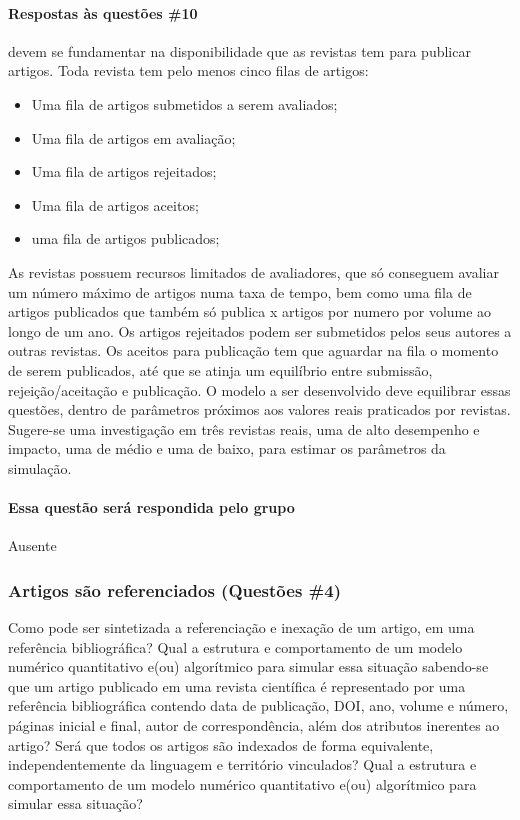 \paragraph{Respostas às questões \#10} devem se fundamentar na disponibilidade que as revistas tem para publicar artigos. Toda revista tem pelo menos cinco filas de artigos:
\begin{itemize}
    \item Uma fila de artigos submetidos a serem avaliados;
    \item Uma fila de artigos em avaliação;
    \item Uma fila de artigos rejeitados;
    \item Uma fila de artigos aceitos;
    \item uma fila de artigos publicados;
\end{itemize} 
As revistas possuem recursos limitados de avaliadores, que só conseguem avaliar um número máximo de artigos numa taxa de tempo, bem como uma fila de artigos publicados que também só publica x artigos por numero por volume ao longo de um ano.
Os artigos rejeitados podem ser submetidos pelos seus autores a outras revistas. Os aceitos para publicação tem que aguardar na fila o momento de serem publicados, até que se atinja um equilíbrio entre submissão, rejeição/aceitação e publicação. O modelo a ser desenvolvido deve equilibrar essas questões, dentro de parâmetros próximos aos valores reais praticados por revistas. Sugere-se uma investigação em três revistas reais, uma de alto desempenho e impacto, uma de médio e uma de baixo, para estimar os parâmetros da simulação.  

\paragraph{Essa questão será respondida pelo grupo}
Ausente

\subsubsection{Artigos são referenciados (Questões \#4)} Como pode ser sintetizada a referenciação e inexação de um artigo, em uma referência bibliográfica? Qual a estrutura e comportamento de um modelo numérico quantitativo e(ou) algorítmico para simular essa situação sabendo-se que um artigo publicado em uma revista científica é representado por uma referência bibliográfica contendo data de publicação, DOI, ano, volume e número, páginas inicial e final, autor de correspondência, além dos atributos inerentes ao artigo? Será que todos os artigos são indexados de forma equivalente, independentemente da linguagem e território vinculados? Qual a estrutura e comportamento de um modelo numérico quantitativo e(ou) algorítmico para simular essa situação?

